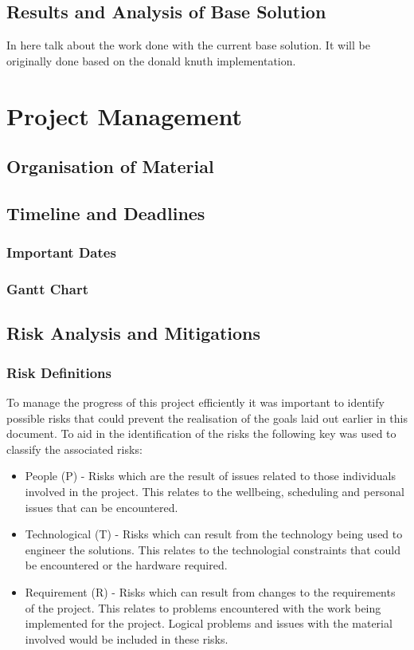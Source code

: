 \documentclass[12pt]{article}  %
\theoremstyle{definition}
\theoremstyle{remark}
\begin{document}
\subsection {Results and Analysis of Base Solution}
In here talk about the work done with the current base solution. It will be originally done based on the donald knuth implementation.


\newpage                     %
\section{Project Management}\label{ss:back}

\subsection {Organisation of Material}

\subsection {Timeline and Deadlines}

\subsubsection {Important Dates}

\subsubsection {Gantt Chart}

\subsection {Risk Analysis and Mitigations}

\subsubsection {Risk Definitions}
To manage the progress of this project efficiently it was important to identify possible risks that could prevent the realisation of the goals laid out earlier in this document. To aid in the identification of the risks the following key was used to classify the associated risks:
\begin{itemize}
\item{People (P) - Risks which are the result of issues related to those individuals involved in the project. This relates to the wellbeing, scheduling and personal issues that can be encountered.}
\item{Technological (T) - Risks which can result from the technology being used to engineer the solutions. This relates to the technologial constraints that could be encountered or the hardware required.}
\item{Requirement (R)  - Risks which can result from changes to the requirements of the project. This relates to problems encountered with the work being implemented for the project. Logical problems and issues with the material involved would be included in these risks.}
\end{itemize}
\end{document}
